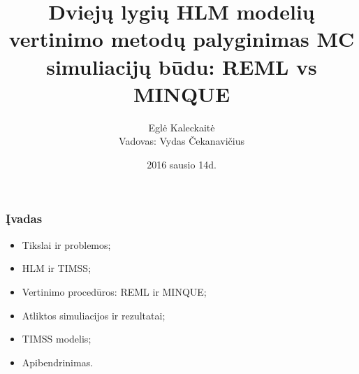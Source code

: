\documentclass[utf8,hyperref={unicode,pdftex}]{beamer}
\title[\hspace{130pt} p. \insertpagenumber\enspace iš \insertdocumentendpage\enspace ]{Dviejų lygių HLM modelių vertinimo metodų palyginimas MC simuliacijų būdu: REML vs MINQUE}
\author[ E. Kaleckaitė]{Eglė Kaleckaitė\\
Vadovas: Vydas Čekanavičius}
\institute{Vilniaus Universitetas, Matematikos ir Informatikos Fakultetas}
\date{2016 sausio 14d.}
\begin{document}
\begin{frame}
\titlepage
\end{frame}
\begin{frame}
\frametitle{Įvadas}
\begin{itemize}
\item Tikslai ir problemos;
\item HLM ir TIMSS;
\item Vertinimo procedūros: REML ir MINQUE;
\item Atliktos simuliacijos ir rezultatai;
\item TIMSS modelis;
\item Apibendrinimas.
\end{itemize}
\end{frame}
\end{document}
